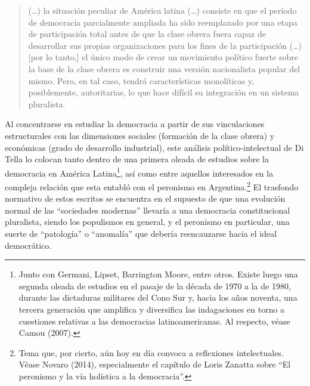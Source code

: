\begin{quote}
(\dots) la situación peculiar de América latina (\dots) consiste en que el período de democracia parcialmente ampliada ha sido reemplazado por una etapa de participación total antes de que la clase obrera fuera capaz de desarrollar sus propias organizaciones para los fines de la participación (\dots) [por lo tanto,] el único modo de crear un movimiento político fuerte sobre la base de la clase obrera es construir una versión nacionalista popular del mismo. Pero, en tal caso, tendrá características monolíticas y, posiblemente, autoritarias, lo que hace difícil su integración en un sistema pluralista.
\end{quote}

Al concentrarse en estudiar la democracia a partir de sus vinculaciones estructurales con las dimensiones sociales (formación de la clase obrera) y económicas (grado de desarrollo industrial), este análisis político-intelectual de Di Tella lo colocan tanto dentro de una primera oleada de estudios sobre la democracia en América Latina\footnote{Junto con Germani, Lipset, Barrington Moore, entre otros. Existe luego una segunda oleada de estudios en el pasaje de la década de 1970 a la de 1980, durante las dictaduras militares del Cono Sur y, hacia los años noventa, una tercera generación que amplifica y diversifica las indagaciones en torno a cuestiones relativas a las democracias latinoamericanas. Al respecto, véase Camou (2007).}, así como entre aquellos interesados en la compleja relación que esta entabló con el peronismo en Argentina.\footnote{Tema que, por cierto, aún hoy en día convoca a reflexiones intelectuales. Véase Novaro (2014), especialmente el capítulo de Loris Zanatta sobre ``El peronismo y la vía holística a la democracia''.} El trasfondo normativo de estos escritos se encuentra en el supuesto de que una evolución normal de las ``sociedades modernas'' llevaría a una democracia constitucional pluralista, siendo los populismos en general, y el peronismo en particular, una suerte de ``patología'' o ``anomalía'' que debería reencauzarse hacia el ideal democrático.

